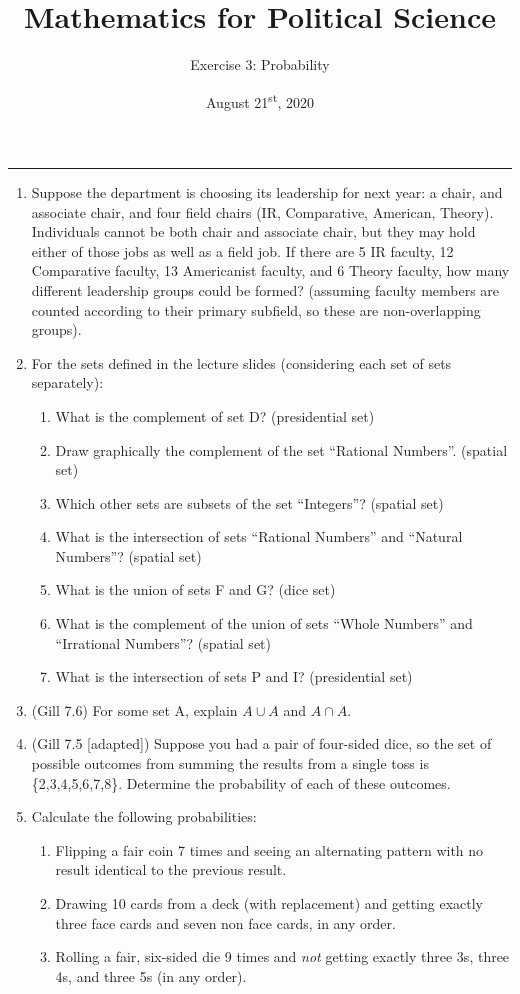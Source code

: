 \documentclass[11pt]{article}
\title{\Large{\bf{\vspace{-100pt}Mathematics for Political Science \vspace{-15pt}}}}
\author{\large{Exercise 3: Probability}}
\date{August 21\textsuperscript{st}, 2020}
\begin{document}
\maketitle

\hrule

\begin{enumerate}

\item Suppose the department is choosing its leadership for next year: a chair, and associate chair, and four field chairs (IR, Comparative, American, Theory).  Individuals cannot be both chair and associate chair, but they may hold either of those jobs as well as a field job.  If there are 5 IR faculty, 12 Comparative faculty, 13 Americanist faculty, and 6 Theory faculty, how many different leadership groups could be formed? (assuming faculty members are counted according to their primary subfield, so these are non-overlapping groups).


\item For the sets defined in the lecture slides (considering each set of sets separately):
\begin{enumerate}
\item What is the complement of set D? (presidential set)
\item Draw graphically the complement of the set ``Rational Numbers''. (spatial set)
\item Which other sets are subsets of the set ``Integers''? (spatial set)
\item What is the intersection of sets ``Rational Numbers'' and ``Natural Numbers''? (spatial set)
\item What is the union of sets F and G? (dice set)
\item What is the complement of the union of sets ``Whole Numbers'' and ``Irrational Numbers''? (spatial set)
\item What is the intersection of sets P and I? (presidential set)
\end{enumerate}


\item (Gill 7.6) For some set A, explain $A \cup A$ and $A \cap A$.


\item (Gill 7.5 [adapted]) Suppose you had a pair of four-sided dice, so the set of possible outcomes from summing the results from a single toss is \{2,3,4,5,6,7,8\}.  Determine the probability of each of these outcomes.


\item Calculate the following probabilities:
\begin{enumerate}
\item Flipping a fair coin 7 times and seeing an alternating pattern with no result identical to the previous result. 
\item Drawing 10 cards from a deck (with replacement) and getting exactly three face cards and seven non face cards, in any order.
\item Rolling a fair, six-sided die 9 times and \textit{not} getting exactly three 3s, three 4s, and three 5s (in any order).
\end{enumerate}



\end{enumerate}
\end{document}
